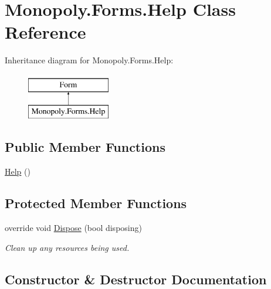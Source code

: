 \hypertarget{class_monopoly_1_1_forms_1_1_help}{}\section{Monopoly.\+Forms.\+Help Class Reference}
\label{class_monopoly_1_1_forms_1_1_help}
Inheritance diagram for Monopoly.\+Forms.\+Help\+:\begin{figure}[H]
\begin{center}
\leavevmode
\includegraphics[height=2.000000cm]{class_monopoly_1_1_forms_1_1_help}
\end{center}
\end{figure}
\subsection*{Public Member Functions}
\begin{DoxyCompactItemize}
\item 
\mbox{\hyperlink{class_monopoly_1_1_forms_1_1_help_ab8c64ed9f0c712a823128a4cda5612c1}{Help}} ()
\end{DoxyCompactItemize}
\subsection*{Protected Member Functions}
\begin{DoxyCompactItemize}
\item 
override void \mbox{\hyperlink{class_monopoly_1_1_forms_1_1_help_aa601c3f000dea4c814dac14e8836d708}{Dispose}} (bool disposing)
\begin{DoxyCompactList}\small\item\em Clean up any resources being used. \end{DoxyCompactList}\end{DoxyCompactItemize}


\subsection{Constructor \& Destructor Documentation}
\mbox{\label{class_monopoly_1_1_forms_1_1_help_ab8c64ed9f0c712a823128a4cda5612c1}} 
